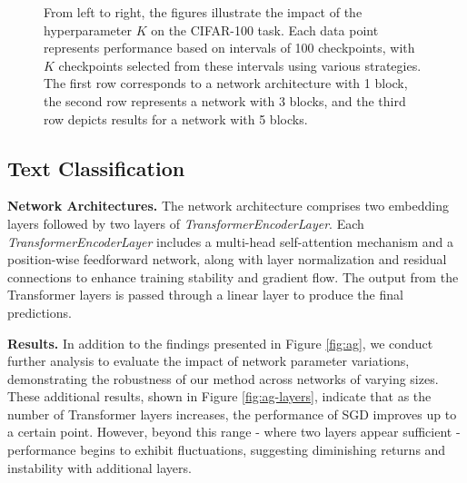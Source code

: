 \begin{figure*}[t!]
    \centering
    \centering
    \centering
    \centering
    \vspace{-0.2cm}
    \caption{From left to right, the figures illustrate the impact of the hyperparameter $K$ on the CIFAR-100 task. 
    Each data point represents performance based on intervals of 100 checkpoints, with $K$ checkpoints selected from these intervals using various strategies.
    The first row corresponds to a network architecture with 1 block, the second row represents a network with 3 blocks, and the third row depicts results for a network with 5 blocks.
    }
    \label{fig:cifar100-layers}
\end{figure*}


\subsection{Text Classification}

\textbf{Network Architectures.} The network architecture comprises two embedding layers followed by two layers of \textit{TransformerEncoderLayer}. Each \textit{TransformerEncoderLayer} includes a multi-head self-attention mechanism and a position-wise feedforward network, along with layer normalization and residual connections to enhance training stability and gradient flow. The output from the Transformer layers is passed through a linear layer to produce the final predictions.

\textbf{Results.} In addition to the findings presented in Figure \ref{fig:ag}, we conduct further analysis to evaluate the impact of network parameter variations, demonstrating the robustness of our method across networks of varying sizes. These additional results, shown in Figure \ref{fig:ag-layers}, indicate that as the number of Transformer layers increases, the performance of SGD improves up to a certain point. However, beyond this range - where two layers appear sufficient - performance begins to exhibit fluctuations, suggesting diminishing returns and instability with additional layers.

